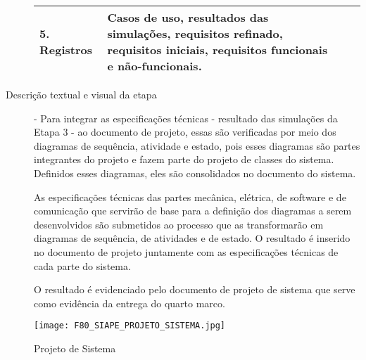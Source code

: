 \begin{description}
\begin{table}[htbp]
\begin{tabular}{|l| p{13.5cm}| c| c| }
		\\ \hline
		\textbf{5. Registros}   & 	
		Casos de uso, resultados das simulações, requisitos refinado, requisitos iniciais, requisitos funcionais e não-funcionais. 
		\\ \hline
	\end{tabular}
	\label{T6}\par
\end{table}
\item[Descrição textual e visual da etapa] - Para integrar as especificações técnicas - resultado das simulações da Etapa 3 - ao documento de projeto, essas são verificadas por meio dos diagramas de sequência, atividade e estado, pois esses diagramas são partes integrantes do projeto e fazem parte do projeto de classes do sistema. Definidos esses diagramas, eles são consolidados no documento do sistema. \par 		   
As especificações técnicas das partes mecânica, elétrica, de software e de comunicação que servirão de base para a definição dos diagramas a serem desenvolvidos são submetidos ao processo que as transformarão em diagramas de sequência, de atividades e de estado. O resultado é inserido no documento de projeto juntamente com as especificações técnicas de cada parte do sistema. \par 		
O resultado é evidenciado pelo documento de projeto de sistema que serve como evidência da entrega do quarto marco. 


\end{description}


		  \begin{figure}[!h]
		  	\centering
		  	\texttt{[image: F80\_SIAPE\_PROJETO\_SISTEMA.jpg]} 
		  	\caption{Projeto de Sistema}
		  	\label{F80}
		  \end{figure}
		  
